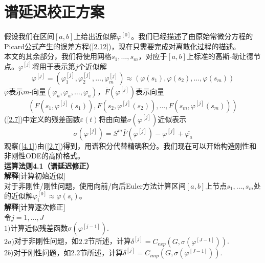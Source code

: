 \documentclass[12pt,a4paper]{article}
\begin{document}
\section{谱延迟校正方案}

假设我们在区间$[a,b]$上给出近似解$\varphi^{[0]}$。我们已经描述了由原始常微分方程的Picard公式产生的误差方程(\ref{2.12})，现在只需要完成对离散化过程的描述。\\

本文的其余部分，我们将使用网格$s_1,\ldots,s_m$，对应于$[a, b]$上标准的高斯-勒让德节点。$\varphi^{[j]}$将用于表示第$j$个近似解\\
$$ \varphi^{[j]}=(\varphi_1^{[j]},\varphi_2^{[j]},\ldots,\varphi_m^{[j]})\approx (\varphi(s_1),\varphi(s_2),\ldots,\varphi(s_m))$$
$\overline{ \varphi}$表示$m$-向量$(\varphi_a,\varphi_a,\ldots,\varphi_a)$，$\overline{F}(\varphi^{[j]})$表示向量\\
$$(F(s_1,\varphi^{[j]}(s_1)),F(s_2,\varphi^{[j]}(s_2)),\ldots,F(s_m,\varphi^{[j]}(s_m)))$$
(\ref{2.7})中定义的残差函数$\varepsilon(t)$将由向量$\sigma(\varphi^{[j]})$近似表示\\
\begin{equation}
\sigma(\varphi^{[j]})=S^m \overline{F}( \varphi^{[j]})- \varphi^{[j]}+\overline{\varphi_a}
\label{4.1}
\end{equation}
观察(\ref{4.1})由(\ref{2.7})得到，用谱积分代替精确积分。我们现在可以开始构造刚性和非刚性ODE的高阶格式。\\

\textbf{运算法则4.1（谱延迟修正）}\\

\textbf{解释}[计算初始近似]\\

对于非刚性/刚性问题，使用向前/向后Euler方法计算区间$[a,b]$上节点$s_1,\ldots,s_m$处的近似解$\varphi^{[0]}_{i} \approx \varphi(s_i)$。\\

\textbf{解释}[计算逐次修正]\\

令$j = 1,\ldots,J$\\

$1)$计算近似残差函数$\sigma(\varphi^{[j-1]})$.\\

$2a)$对于非刚性问题，如$2.2$节所述，计算$\delta^{[j]}=C_{exp}(G,\sigma(\varphi^{[J-1]}))$.\\

$2b)$对于刚性问题，如$2.2$节所述，计算$\delta^{[j]}=C_{imp}(G,\sigma(\varphi^{[J-1]}))$.\\
\end{document}
